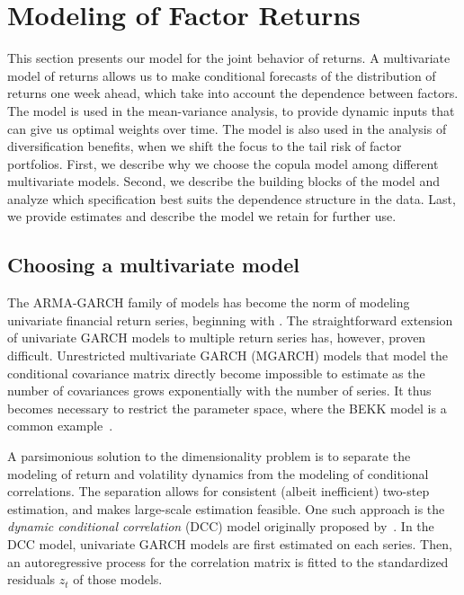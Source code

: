 
\section{Modeling of Factor Returns} %
\label{sec:modeling_of_factor_returns}

This section presents our model for the joint behavior of returns. A multivariate model of returns allows us to make conditional forecasts of the distribution of returns one week ahead, which take into account the dependence between factors. The model is used in the mean-variance analysis, to provide dynamic inputs that can give us optimal weights over time. The model is also used in the analysis of diversification benefits, when we shift the focus to the tail risk of factor portfolios. First, we describe why we choose the copula model among different multivariate models. Second, we describe the building blocks of the model and analyze which specification best suits the dependence structure in the data. Last, we provide estimates and describe the model we retain for further use.

\subsection{Choosing a multivariate model}
The ARMA-GARCH family of models has become the norm of modeling univariate financial return series, beginning with \textcite{Bollerslev1986}. The straightforward extension of univariate GARCH models to multiple return series has, however, proven difficult. Unrestricted multivariate GARCH (MGARCH) models that model the conditional covariance matrix directly become impossible to estimate as the number of covariances grows exponentially with the number of series. It thus becomes necessary to restrict the parameter space, where the BEKK model is a common example~\autocite{BEKKModel}.

A parsimonious solution to the dimensionality problem is to separate the modeling of return and volatility dynamics from the modeling of conditional correlations. The separation allows for consistent (albeit inefficient) two-step estimation, and makes large-scale estimation feasible. One such approach is the \emph{dynamic conditional correlation} (DCC) model originally proposed by~\autocite{Engle2002}. In the DCC model, univariate GARCH models are first estimated on each series. Then, an autoregressive process for the correlation matrix is fitted to the standardized residuals ${z_t}$ of those models. 

